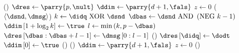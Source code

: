 \myproc(\pinit{}){
 $\dres\leftarrow\parry{p,\nult}$\;
 $\ddim\leftarrow\parry{d+1,\fals}$\;
 $z\leftarrow0$\;
}
\WhnRcv($\tupl{\dsnd,\dmsg}$){
 $k\leftarrow\didq\mbox{ XOR }\dsnd$\;
 $\dbas\leftarrow\dsnd\mbox{ AND }\brak{\mbox{NEG } k-1}$\;
 $\ddim\fbrk{1+\log_2k}\leftarrow\true$\;
 $l\leftarrow\funm{min}{k,p-\dbas}$\;
 $\dres\fbrk{\dbas:\dbas+l-1}\leftarrow\dmsg\fbrk{0:l-1}$\;
 \pzedt{}\;
}
\myproc(\pgata{\dodt}){
 $\dres\fbrk{\didq}\leftarrow\dodt$\;
 $\ddim\fbrk{0}\leftarrow\true$\;
 \pzedt{}\;
}
\myproc(\predy{}){
 \;
}
\myproc(\prest{}){
 $\ddim\leftarrow\parry{d+1,\fals}$\;
 $z\leftarrow 0$\;
}{}
\myproc(\pzedt{}){
}